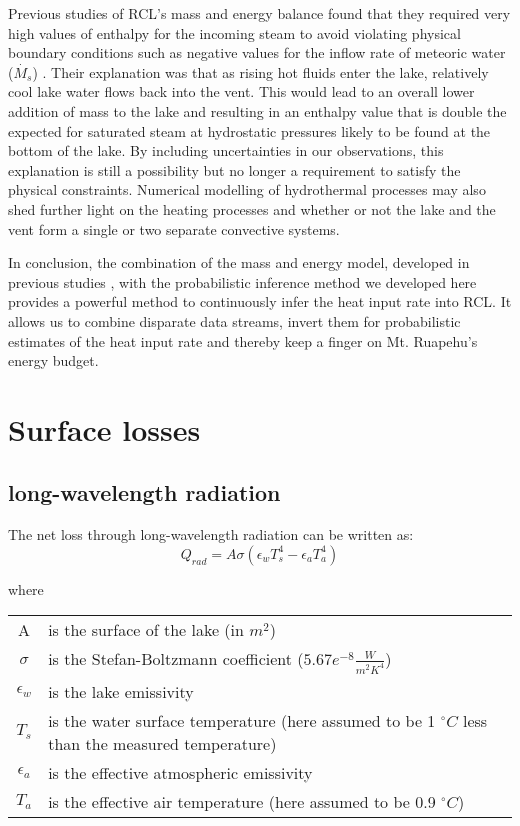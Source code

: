 \documentclass[doublespacing]{bmcart}
\begin{document}
Previous studies of RCL's mass and energy balance found that they required very
high values of enthalpy for the incoming steam to avoid violating physical
boundary conditions such as negative values for the inflow rate of meteoric
water ($\dot{M_s}$) \cite{Hurst1991, hurstCraterLakeEnergy2015}. Their
explanation was that as rising hot fluids enter the lake, relatively cool lake
water flows back into the vent. This would lead to an overall lower addition of
mass to the lake and resulting in an enthalpy value that is double the expected
for saturated steam at hydrostatic pressures likely to be found at the bottom of
the lake. By including uncertainties in our observations, this explanation is
still a possibility but no longer a requirement to satisfy the physical
constraints. Numerical modelling of hydrothermal processes may also shed further
light on the heating processes and whether or not the lake and the vent form a
single or two separate convective systems.

In conclusion, the combination of the mass and energy model, developed in
previous studies \cite{Hurst1991,hurstCraterLakeEnergy2015}, with the
probabilistic inference method we developed here provides a powerful method to
continuously infer the heat input rate into RCL. It allows us to combine
disparate data streams, invert them for probabilistic estimates of the heat
input rate and thereby keep a finger on Mt. Ruapehu's energy budget.

\appendix
\section{Surface losses}\label{A}
\subsection{long-wavelength radiation}
The net loss through long-wavelength radiation can be written as:
\begin{equation}
    Q_{rad} = A\sigma(\epsilon_w T_s^4 - \epsilon_a T_a^4)
\end{equation}

where
\begin{table}[h!]
\begin{tabular}{cp{8cm}}
    A & is the surface of the lake (in $m^2$) \\
    $\sigma$ & is the Stefan-Boltzmann coefficient ($5.67e^{-8} \frac{W}{m^2 K^4}$) \\
    $\epsilon_w$ & is the lake emissivity \\
    $T_s$ & is the water surface temperature (here assumed to be 1 $^{\circ}C$ less than the
    measured temperature) \\
    $\epsilon_a$ & is the effective atmospheric emissivity \\
    $T_a$ & is the effective air temperature (here assumed to be 0.9 $^{\circ}C$) \\ 
\end{tabular}
\end{table}
\end{document}
